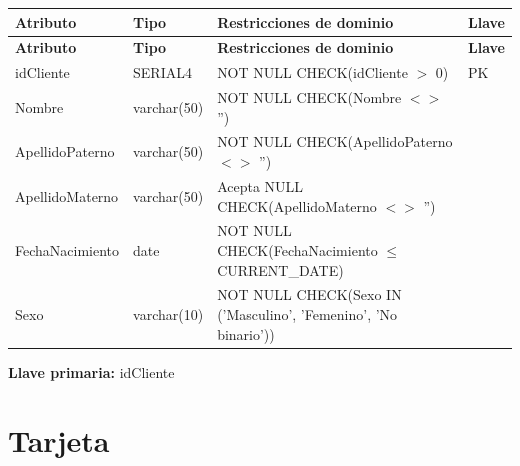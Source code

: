 \documentclass[12pt]{article}
\begin{document}
\begin{longtable}{p{3.5cm} p{2.5cm} p{7.5cm} p{1.5cm}}
\label{tab:cliente}\\
\toprule
\textbf{Atributo} & \textbf{Tipo} & \textbf{Restricciones de dominio} & \textbf{Llave} \\
\midrule
\endfirsthead

\toprule
\textbf{Atributo} & \textbf{Tipo} & \textbf{Restricciones de dominio} & \textbf{Llave} \\
\midrule
\endhead
\bottomrule
\endfoot

idCliente 
& SERIAL4 
& NOT NULL \newline CHECK(idCliente $>$ 0)
& PK \\

Nombre 
& varchar(50) 
& NOT NULL \newline CHECK(Nombre $<>$ '')
&  \\

ApellidoPaterno 
& varchar(50) 
& NOT NULL \newline CHECK(ApellidoPaterno $<>$ '')
&  \\

ApellidoMaterno 
& varchar(50) 
& Acepta NULL \newline CHECK(ApellidoMaterno $<>$ '')
&  \\

FechaNacimiento 
& date 
& NOT NULL \newline CHECK(FechaNacimiento $\leq$ CURRENT\_DATE)
&  \\

Sexo 
& varchar(10) 
& NOT NULL \newline CHECK(Sexo IN ('Masculino', 'Femenino', 'No binario'))
&  \\

\end{longtable}

\vspace{2pt}
\textbf{Llave primaria:} idCliente\\


\section*{Tarjeta}
\end{document}
